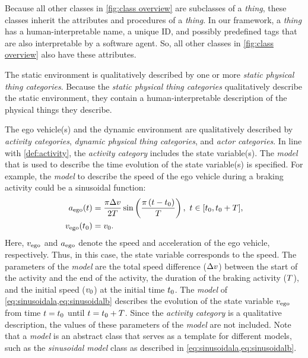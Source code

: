 \cstartb Because all other classes in \cref{fig:class overview} are subclasses of a \textit{thing}, these classes inherit the attributes and procedures of a \textit{thing}. In our framework, a \textit{thing} has a human-interpretable name, a unique ID, and possibly predefined tags that are also interpretable by a software agent. So, all other classes in \cref{fig:class overview} also have these attributes. \cendb

The static environment is qualitatively described by \cstarte one or more \cende\cstartc \textit{static physical thing categories}. \cendc
Because the \cstartc\textit{static physical thing categories} \cendc qualitatively describe the static environment, they contain a human-interpretable description of the \cstartc physical things they describe\cendc.

The ego vehicle\cstartd(s) \cendd and the dynamic environment are qualitatively described by \textit{activity categories}, \cstartb\textit{dynamic physical thing categories}\cendb, and \textit{actor categories}. 
In line with \cref{def:activity}, the \textit{activity category} includes the state variable(s).
The \textit{model} that is used to describe the time evolution of the state  variable(s) is specified. For example, the \textit{model} to describe the speed of the ego vehicle during a braking activity could be a sinusoidal function:
\begin{align} 
	\egoacceleration(\time) &= \frac{\pi \amplitude}{2\duration} \sin \left( \frac{\pi \left( \time - \inittime\right)}{\duration} \right),\ \time \in [\inittime, \inittime+\duration], \label{eq:sinusoidala} \\
	\egospeed(\inittime) &= \egospeedinit. \label{eq:sinusoidalb}
\end{align}
Here, $v_{\mathrm{ego}}$ and $a_{\mathrm{ego}}$ denote the speed and acceleration of the ego vehicle, respectively. Thus, in this case, the state variable corresponds to the speed. 
The parameters of the \textit{model} are the total speed difference ($\Delta v$) between the start of the activity and the end of the activity, the duration of the braking activity ($T$), and the initial speed ($v_{0}$) at the initial time $t_{0}$. 
The \textit{model} of \cref{eq:sinusoidala,eq:sinusoidalb} describes the evolution of the state variable $v_{\mathrm{ego}}$ from time $t=t_{0}$ until $t=t_{0}+T$. Since the \textit{activity category} is a qualitative description, the values of these parameters of the \textit{model} are not included.
\cstartb Note that a \textit{model} is an abstract class that serves as a template for different models, such as the \textit{sinusoidal model} class as described in \cref{eq:sinusoidala,eq:sinusoidalb}. \cendb

